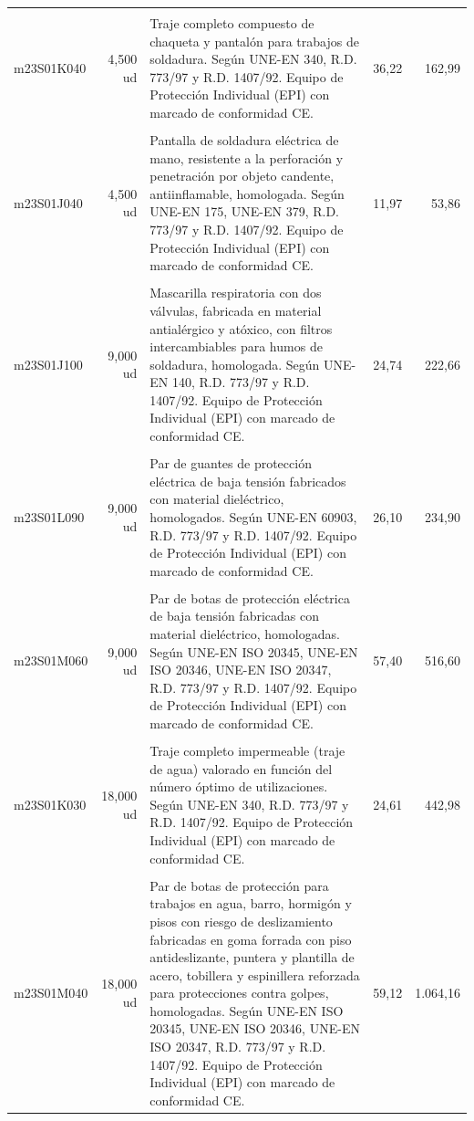 \documentclass{book}%
\begin{document}
\begin{longtable}{lrlrr}
&&&&\\%
m23S01K040&     4,500 ud&\multicolumn{1}{p{5cm}}{Traje completo compuesto de chaqueta y pantalón para trabajos de soldadura. Según UNE{-}EN 340, R.D. 773/97 y R.D. 1407/92. Equipo de Protección Individual (EPI) con marcado de conformidad CE.}&     36,22&162,99\\%
&&&&\\%
m23S01J040&     4,500 ud&\multicolumn{1}{p{5cm}}{Pantalla de soldadura eléctrica de mano, resistente a la perforación y penetración por objeto candente, antiinflamable, homologada. Según UNE{-}EN 175, UNE{-}EN 379, R.D. 773/97 y R.D. 1407/92. Equipo de Protección Individual (EPI) con marcado de conformidad CE.}&     11,97&53,86\\%
&&&&\\%
m23S01J100&     9,000 ud&\multicolumn{1}{p{5cm}}{Mascarilla respiratoria con dos válvulas, fabricada en material antialérgico y atóxico, con filtros intercambiables para humos de soldadura, homologada. Según UNE{-}EN 140, R.D. 773/97 y R.D. 1407/92. Equipo de Protección Individual (EPI) con marcado de conformidad CE.}&     24,74&222,66\\%
&&&&\\%
m23S01L090&     9,000 ud&\multicolumn{1}{p{5cm}}{Par de guantes de protección eléctrica de baja tensión fabricados con material dieléctrico, homologados. Según UNE{-}EN 60903, R.D. 773/97 y R.D. 1407/92. Equipo de Protección Individual (EPI) con marcado de conformidad CE.}&     26,10&234,90\\%
&&&&\\%
m23S01M060&     9,000 ud&\multicolumn{1}{p{5cm}}{Par de botas de protección eléctrica de baja tensión fabricadas con material dieléctrico, homologadas. Según UNE{-}EN ISO 20345, UNE{-}EN ISO 20346, UNE{-}EN ISO 20347, R.D. 773/97 y R.D. 1407/92. Equipo de Protección Individual (EPI) con marcado de conformidad CE.}&     57,40&516,60\\%
&&&&\\%
m23S01K030&    18,000 ud&\multicolumn{1}{p{5cm}}{Traje completo impermeable (traje de agua) valorado en función del número óptimo de utilizaciones. Según UNE{-}EN 340, R.D. 773/97 y R.D. 1407/92. Equipo de Protección Individual (EPI) con marcado de conformidad CE.}&     24,61&442,98\\%
&&&&\\%
m23S01M040&    18,000 ud&\multicolumn{1}{p{5cm}}{Par de botas de protección para trabajos en agua, barro, hormigón y pisos con riesgo de deslizamiento fabricadas en goma forrada con piso antideslizante, puntera y plantilla de acero, tobillera y espinillera reforzada para protecciones contra golpes, homologadas. Según UNE{-}EN ISO 20345, UNE{-}EN ISO 20346, UNE{-}EN ISO 20347, R.D. 773/97 y R.D. 1407/92. Equipo de Protección Individual (EPI) con marcado de conformidad CE.}&     59,12&1.064,16\\%

\end{longtable}
\end{document}
